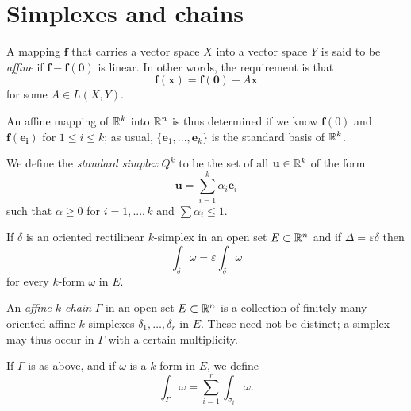 
\section{Simplexes and chains}

\begin{mydef}
    A mapping $\mathbf{f}$ that carries a vector space $X$ into a
    vector space $Y$ is said to be \emph{affine} if $\mathbf{f - f(0)}$ is linear. 
    In other words, the requirement is that
    \begin{equation}
        \label{eq:10.73}
        \mathbf{f(x)} = 
        \mathbf{f(0)} + A \mathbf{x}
    \end{equation}
    for some $A \in L(X, Y)$.

    An affine mapping of ${\protect\mathbb R}^k$ into ${\protect\mathbb R}^n$ is thus determined if we know $\mathbf{f}(0)$ and $\mathbf{f(e_i)}$ for $1 \leq i \leq k$; 
    as usual, $\{\mathbf{e}_1, ... , \mathbf{e}_k\}$ is the standard basis of ${\protect\mathbb R}^k$.
    
    We define the \emph{standard simplex} $Q^k$ to be the set of all $\mathbf{u} \in {\protect\mathbb R}^k$ of the form
    \begin{equation}
        \label{eq;10.74}
        \mathbf{u} = \sum_{i=1}^{k} \alpha_i \mathbf{e}_i
    \end{equation}
    such that $\alpha \geq 0$ for $i = 1, ... , k$ and $\sum \alpha_i \leq 1$.
\end{mydef}

\begin{thm}
    \label{thm:10.27}
    If $\delta$ is an oriented rectilinear $k$-simplex in an open set $E \subset {\protect\mathbb R}^n$ 
    and if $\bar{\Delta} = \varepsilon \delta$ then
    \begin{equation}
        \label{eq:10.81}
        \int_{\bar{\delta}} \omega = 
        \varepsilon \int_{\delta} \omega 
    \end{equation}
    for every $k$-form $\omega$ in $E$.
\end{thm}


\begin{mydef}
    An \emph{affine $k$-chain} $\Gamma$ in an open set $E \subset {\protect\mathbb R}^n$ is a collection of finitely many oriented affine $k$-simplexes $\delta_1, \dots, \delta_r$ in $E$. 
    These need not be distinct; 
    a simplex may thus occur in $\Gamma$ with a certain multiplicity.

    If $\Gamma$ is as above, and if $\omega$ is a $k$-form in $E$,
    we define 
    \begin{equation}
        \label{eq:10.82}
        \int_{\Gamma} \omega =
        \sum_{i=1}^{r} \int_{\sigma_i} \omega .
    \end{equation}
\end{mydef}

